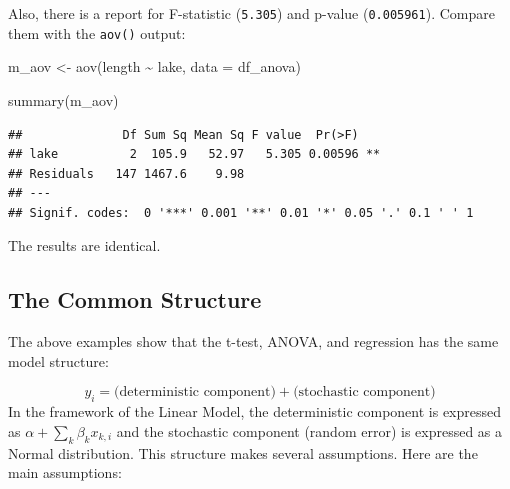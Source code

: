 \documentclass[
]{book}
\newenvironment{Shaded}{\begin{snugshade}}{\end{snugshade}}
\newcommand{\AttributeTok}[1]{\textcolor[rgb]{0.77,0.63,0.00}{#1}}
\newcommand{\FunctionTok}[1]{\textcolor[rgb]{0.00,0.00,0.00}{#1}}
\newcommand{\NormalTok}[1]{#1}
\newcommand{\OtherTok}[1]{\textcolor[rgb]{0.56,0.35,0.01}{#1}}
\newcommand{\SpecialCharTok}[1]{\textcolor[rgb]{0.00,0.00,0.00}{#1}}
\begin{document}
Also, there is a report for F-statistic (\texttt{5.305}) and p-value (\texttt{0.005961}). Compare them with the \texttt{aov()} output:

\begin{Shaded}
\begin{Highlighting}[]
\NormalTok{m\_aov }\OtherTok{\textless{}{-}} \FunctionTok{aov}\NormalTok{(length }\SpecialCharTok{\textasciitilde{}}\NormalTok{ lake,}
             \AttributeTok{data =}\NormalTok{ df\_anova)}

\FunctionTok{summary}\NormalTok{(m\_aov)}
\end{Highlighting}
\end{Shaded}

\begin{verbatim}
##              Df Sum Sq Mean Sq F value  Pr(>F)   
## lake          2  105.9   52.97   5.305 0.00596 **
## Residuals   147 1467.6    9.98                   
## ---
## Signif. codes:  0 '***' 0.001 '**' 0.01 '*' 0.05 '.' 0.1 ' ' 1
\end{verbatim}

The results are identical.

\hypertarget{the-common-structure}{%
\subsection{The Common Structure}\label{the-common-structure}}

The above examples show that the t-test, ANOVA, and regression has the same model structure:

\[
y_i = \text{(deterministic component)} + \text{(stochastic component)}
\] In the framework of the Linear Model, the deterministic component is expressed as \(\alpha + \sum_k \beta_k x_{k,i}\) and the stochastic component (random error) is expressed as a Normal distribution. This structure makes several assumptions. Here are the main assumptions:
\end{document}
